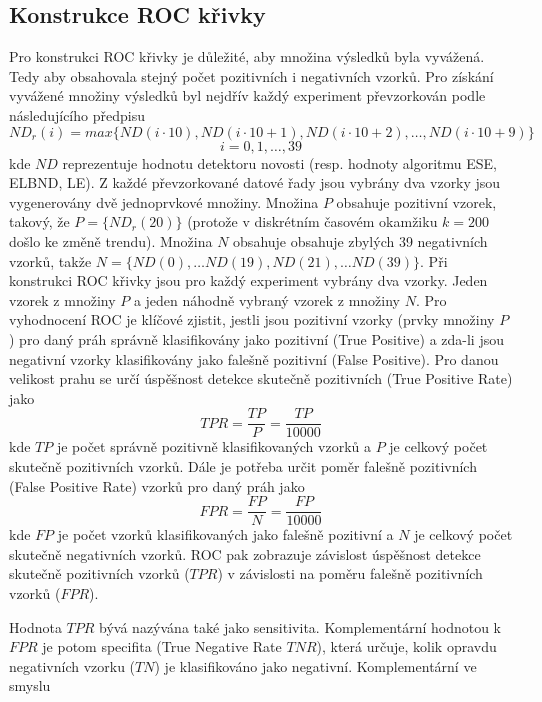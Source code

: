 \subsection{Konstrukce ROC křivky}\label{chap:roc_specs}
Pro konstrukci ROC křivky je důležité, aby množina výsledků byla vyvážená. Tedy aby obsahovala stejný počet pozitivních i negativních vzorků. Pro získání vyvážené množiny výsledků byl nejdřív každý experiment převzorkován podle následujícího předpisu
\begin{equation}
    ND_r(i) = max\{ND(i \cdot 10), ND(i \cdot 10 + 1), ND(i \cdot 10 + 2), \dots, ND(i \cdot 10 + 9)\}
\end{equation}
\begin{equation*}
i = 0,1,\dots,39
\end{equation*}
kde $ND$ reprezentuje hodnotu detektoru novosti (resp. hodnoty algoritmu ESE, ELBND, LE). Z každé převzorkované datové řady jsou vybrány dva vzorky jsou vygenerovány dvě jednoprvkové množiny. Množina $P$ obsahuje pozitivní vzorek, takový, že $P=\{ND_r(20)\}$ (protože v diskrétním časovém okamžiku $k=200$ došlo ke změně trendu).  Množina $N$ obsahuje obsahuje zbylých 39 negativních vzorků, takže $N=\{ND(0), \dots ND(19), ND(21), \dots ND(39) \}$. Při konstrukci ROC křivky jsou pro každý experiment vybrány dva vzorky. Jeden vzorek z množiny $P$ a jeden náhodně vybraný vzorek z množiny $N$. Pro vyhodnocení ROC je klíčové zjistit, jestli jsou pozitivní vzorky (prvky množiny $P$) pro daný práh správně klasifikovány jako pozitivní (True Positive) a zda-li jsou negativní vzorky klasifikovány jako falešně pozitivní (False Positive). Pro danou velikost prahu se určí úspěšnost detekce skutečně pozitivních (True Positive Rate) jako 
\begin{equation}
TPR=\frac{TP}{P}=\frac{TP}{10000}
\end{equation}
kde $TP$ je počet správně pozitivně klasifikovaných vzorků a $P$ je celkový počet skutečně pozitivních vzorků. Dále je potřeba určit poměr falešně pozitivních (False Positive Rate) vzorků pro daný práh jako
\begin{equation}
FPR=\frac{FP}{N}=\frac{FP}{10000}
\end{equation}
kde $FP$ je počet vzorků klasifikovaných jako falešně pozitivní a $N$ je celkový počet skutečně negativních vzorků. ROC pak zobrazuje závislost úspěšnost detekce skutečně pozitivních vzorků ($TPR$) v závislosti na poměru falešně pozitivních vzorků ($FPR$).
\par 
Hodnota $TPR$ bývá nazývána také jako sensitivita. Komplementární hodnotou k $FPR$ je potom specifita (True Negative Rate $TNR$), která určuje, kolik opravdu negativních vzorku ($TN$) je klasifikováno jako negativní. Komplementární ve smyslu
